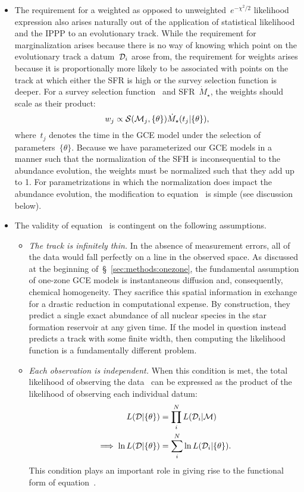 \documentclass[ms.tex]{subfiles}
\begin{document}
\begin{itemize}
	\item The requirement for a weighted as opposed to
	unweighted~$e^{-\chi^2/2}$ likelihood expression also arises naturally out
	of the application of statistical likelihood and the IPPP to an
	evolutionary track.
	While the requirement for marginalization arises because there is no way of
	knowing which point on the evolutionary track a datum~$\mathcal{D}_i$ arose
	from, the requirement for weights arises because it is proportionally more
	likely to be associated with points on the track at which either the SFR is
	high or the survey selection function is deeper.
	For a survey selection function~ and SFR~$\dot{M}_\star$, the
	weights should scale as their product:
	\begin{equation}
	w_j \propto \mathcal{S}(\mathcal{M}_j, \{\theta\}) \dot{M}_\star(t_j |
	\{\theta\}),
	\label{eq:weights}
	\end{equation}
	where~$t_j$ denotes the time in the GCE model under the selection of
	parameters~$\{\theta\}$.
	Because we have parameterized our GCE models in a manner such that the
	normalization of the SFH is inconsequential to the abundance evolution,
	the weights must be normalized such that they add up to 1.
	For parametrizations in which the normalization does impact the abundance
	evolution, the modification to equation~ is simple
	(see discussion below).

	\item The validity of equation~ is contingent on the
	following assumptions.
	\begin{itemize}
		\item \textit{The track is infinitely thin.}
		In the absence of measurement errors, all of the data would fall
		perfectly on a line in the observed space.
		As discussed at the beginning of~\S~\ref{sec:methods:onezone}, the
		fundamental assumption of one-zone GCE models is instantaneous
		diffusion and, consequently, chemical homogeneity.
		They sacrifice this spatial information in exchange for a drastic
		reduction in computational expense.
		By construction, they predict a single exact abundance of all nuclear
		species in the star formation reservoir at any given time.
		If the model in question instead predicts a track with some finite
		width, then computing the likelihood function is a fundamentally
		different problem.

		\item \textit{Each observation is independent.}
		When this condition is met, the total likelihood of observing the
		data~ can be expressed as the product of the likelihood of
		observing each individual datum:
		\begin{subequations}\begin{align}
		L(\mathcal{D} | \{\theta\}) &= \prod_i^N L(\mathcal{D}_i | \mathcal{M})
		\\
		\implies \ln L(\mathcal{D} | \{\theta\}) &= \sum_i^N \ln
		L(\mathcal{D}_i | \{\theta\}).
		\end{align}\end{subequations}
		This condition plays an important role in giving rise to the
		functional form of equation~.


\end{itemize}
\end{itemize}
\end{document}
